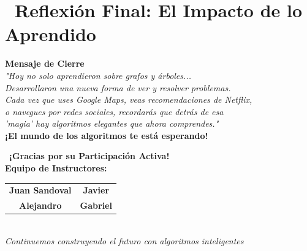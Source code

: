 \documentclass[12pt,a4paper]{article}
\begin{document}
	\newpage
	
	\section*{\faHeart\ Reflexión Final: El Impacto de lo Aprendido}
	
	\begin{center}
		\begin{tcolorbox}[colback=primaryblue!10, colframe=primaryblue, rounded corners, width=0.9\textwidth]
			\centering
			\Large\textbf{Mensaje de Cierre}\\[0.5cm]
			\normalsize\textit{"Hoy no solo aprendieron sobre grafos y árboles...\\
				Desarrollaron una nueva forma de ver y resolver problemas.\\[0.3cm]
				Cada vez que uses Google Maps, veas recomendaciones de Netflix,\\
				o navegues por redes sociales, recordarás que detrás de esa\\
				'magia' hay algoritmos elegantes que ahora comprendes."}\\[0.5cm]
			\textbf{¡El mundo de los algoritmos te está esperando!}
		\end{tcolorbox}
	\end{center}
	
	\vfill
	
	\begin{center}
		\begin{tcolorbox}[colback=secondarygreen!10, colframe=secondarygreen, rounded corners]
			\centering
			\Large\faThumbsUp\ \textbf{¡Gracias por su Participación Activa!}\\[0.5cm]
			\textbf{Equipo de Instructores:}\\[0.3cm]
			\begin{tabular}{cc}
				\textbf{Juan Sandoval} & \textbf{Javier} \\
				\textbf{Alejandro} & \textbf{Gabriel}
			\end{tabular}\\[0.5cm]
			\textit{Continuemos construyendo el futuro con algoritmos inteligentes}
		\end{tcolorbox}
	\end{center}
\end{document}

